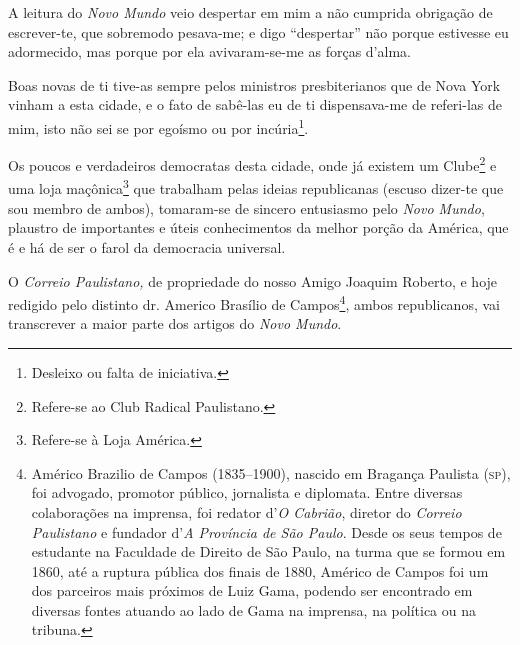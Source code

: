 {A leitura do \emph{Novo Mundo} veio despertar em mim a não cumprida
obrigação de escrever-te, que sobremodo pesava-me; e digo ``despertar''
não porque estivesse eu adormecido, mas porque por ela avivaram-se-me as
forças d'alma.

Boas novas de ti tive-as sempre pelos ministros presbiterianos que de
Nova York vinham a esta cidade, e o fato de sabê-las eu de ti
dispensava-me de referi-las de mim, isto não sei se por egoísmo ou por
incúria\footnote{ Desleixo ou falta de iniciativa.}.

Os poucos e verdadeiros democratas desta cidade, onde já existem um
Clube\footnote{ Refere-se ao Club Radical Paulistano.} e uma loja
maçônica\footnote{ Refere-se à Loja América.} que trabalham pelas
ideias republicanas (escuso dizer-te que sou membro de ambos),
tomaram-se de sincero entusiasmo pelo \emph{Novo Mundo}, plaustro de
importantes e úteis conhecimentos da melhor porção da América, que é e
há de ser o farol da democracia universal.

O \emph{Correio Paulistano,} de propriedade do nosso Amigo Joaquim
Roberto, e hoje redigido pelo distinto dr. Americo Brasílio de
Campos\footnote{ Américo Brazilio de Campos (1835--1900), nascido em
  Bragança Paulista (\textsc{sp}), foi advogado, promotor público, jornalista e
  diplomata. Entre diversas colaborações na imprensa, foi redator
  d'\emph{O Cabrião}, diretor do \emph{Correio Paulistano} e fundador
  d'\emph{A Província de São Paulo}. Desde os seus tempos de estudante
  na Faculdade de Direito de São Paulo, na turma que se formou em 1860,
  até a ruptura pública dos finais de 1880, Américo de Campos foi um dos
  parceiros mais próximos de Luiz Gama, podendo ser encontrado em
  diversas fontes atuando ao lado de Gama na imprensa, na política ou na
  tribuna.}, ambos republicanos, vai transcrever a maior parte dos
artigos do \emph{Novo Mundo}.

}
